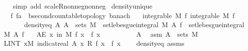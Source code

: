 \begin{isabellebody}
\ \ \isamarkupfalse%
\ {\isacharparenleft}{\kern0pt}simp\ add{\isacharcolon}{\kern0pt}\ scaleR{\isacharunderscore}{\kern0pt}nonneg{\isacharunderscore}{\kern0pt}nonneg{\isacharparenright}{\kern0pt}%
\endisatagproof
{\isafoldproof}%
%
\isadelimproof
\isanewline
%
\endisadelimproof
\isanewline
{}\isamarkupfalse%
\ density{\isacharunderscore}{\kern0pt}unique{\isacharcolon}{\kern0pt}\isanewline
\ \ \ f\ f{\isacharprime}{\kern0pt}{\isacharcolon}{\kern0pt}{\isacharcolon}{\kern0pt}{\isachardoublequoteopen}{\isacharprime}{\kern0pt}a\ {\isasymRightarrow}\ {\isacharprime}{\kern0pt}b{\isacharcolon}{\kern0pt}{\isacharcolon}{\kern0pt}{\isacharbraceleft}{\kern0pt}second{\isacharunderscore}{\kern0pt}countable{\isacharunderscore}{\kern0pt}topology{\isacharcomma}{\kern0pt}\ banach{\isacharbraceright}{\kern0pt}{\isachardoublequoteclose}\isanewline
\ \ \ {\isachardoublequoteopen}integrable\ M\ f{\isachardoublequoteclose}\ {\isachardoublequoteopen}integrable\ M\ f{\isacharprime}{\kern0pt}{\isachardoublequoteclose}\isanewline
\ \ \ \ \ \ \ density{\isacharunderscore}{\kern0pt}eq{\isacharcolon}{\kern0pt}\ {\isachardoublequoteopen}{\isasymAnd}A{\isachardot}{\kern0pt}\ A\ {\isasymin}\ sets\ M\ {\isasymLongrightarrow}\ set{\isacharunderscore}{\kern0pt}lebesgue{\isacharunderscore}{\kern0pt}integral\ M\ A\ f\ {\isacharequal}{\kern0pt}\ set{\isacharunderscore}{\kern0pt}lebesgue{\isacharunderscore}{\kern0pt}integral\ M\ A\ f{\isacharprime}{\kern0pt}{\isachardoublequoteclose}\isanewline
\ \ \ {\isachardoublequoteopen}AE\ x\ in\ M{\isachardot}{\kern0pt}\ f\ x\ {\isacharequal}{\kern0pt}\ f{\isacharprime}{\kern0pt}\ x{\isachardoublequoteclose}\isanewline
%
\isadelimproof
%
\endisadelimproof
%
\isatagproof
{}\isamarkupfalse%
{\isacharminus}{\kern0pt}\isanewline
\ \ \isacommand{{\isacharbraceleft}{\kern0pt}}\isamarkupfalse%
\ \isanewline
\ \ \ \ \isamarkupfalse%
\ A\ \isamarkupfalse%
\ asm{\isacharcolon}{\kern0pt}\ {\isachardoublequoteopen}A\ {\isasymin}\ sets\ M{\isachardoublequoteclose}\isanewline
\ \ \ \ \isamarkupfalse%
\ {\isachardoublequoteopen}LINT\ x{\isacharbar}{\kern0pt}M{\isachardot}{\kern0pt}\ indicat{\isacharunderscore}{\kern0pt}real\ A\ x\ {\isacharasterisk}{\kern0pt}\isactrlsub R\ {\isacharparenleft}{\kern0pt}f\ x\ {\isacharminus}{\kern0pt}\ f{\isacharprime}{\kern0pt}\ x{\isacharparenright}{\kern0pt}\ {\isacharequal}{\kern0pt}\ {}{\isachardoublequoteclose}\ \isamarkupfalse%
\ density{\isacharunderscore}{\kern0pt}eq\ assms{\isacharparenleft}{\kern0pt}{}{\isacharcomma}{\kern0pt}{}{\isacharparenright}{\kern0pt}\ \isamarkupfalse%

\end{isabellebody}
